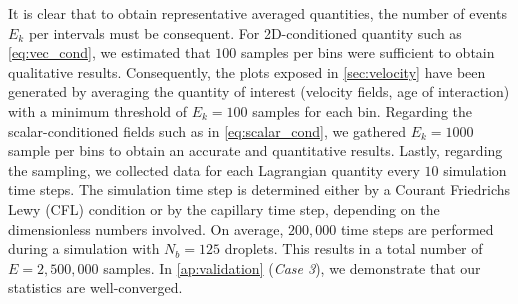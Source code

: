 It is clear that to obtain representative averaged quantities, the number of events $E_k$ per intervals must be consequent. 
For 2D-conditioned quantity such as \ref{eq:vec_cond}, we estimated that $100$ samples per bins were sufficient to obtain qualitative results. 
Consequently, the plots exposed in \ref{sec:velocity} have been generated by averaging the quantity of interest (velocity fields, age of interaction) with a minimum threshold of $E_k = 100$ samples for each bin.
Regarding the scalar-conditioned fields such as in \ref{eq:scalar_cond}, we gathered $E_k = 1000$ sample per bins to obtain an accurate and quantitative results. 
Lastly, regarding the sampling, we collected data for each Lagrangian quantity every $10$ simulation time steps. 
The simulation time step is determined either by a Courant Friedrichs Lewy (CFL) condition or by the capillary time step, depending on the dimensionless numbers involved.
On average, $200,000$ time steps are performed during a simulation with $N_b = 125$ droplets. This results in a total number of $E = 2,500,000$ samples. In \ref{ap:validation} (\textit{Case 3}), we demonstrate that our statistics are well-converged.

